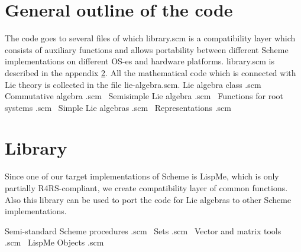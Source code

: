 \documentclass[a4paper,10pt]{article}%
\theoremstyle{definition} \newtheorem{Def}{Definition}
\begin{document}
            
\nwendcode{}\nwdocspar
\section{General outline of the code}
\label{sec:general-outline-code}

The code goes to several files of which {\Tt{}library.scm\nwendquote} is a compatibility layer which consists of auxiliary functions and allows portability between different Scheme implementations on different OS-es and hardware platforms. {\Tt{}library.scm\nwendquote} is described in the appendix \ref{sec:library}.
All the mathematical code which is connected with Lie theory is collected in the file {\Tt{}lie-algebra.scm\nwendquote}.
\nwenddocs{}\endmoddef\let\nwnotused=\nwoutput{}\nwstartdeflinemarkup\nwenddeflinemarkup
\LA{}Lie algebra class .scm~{\nwtagstyle{}}\RA{}
\LA{}Commutative algebra .scm~{\nwtagstyle{}}\RA{}
\LA{}Semisimple Lie algebra .scm~{\nwtagstyle{}}\RA{}
\LA{}Functions for root systems .scm~{\nwtagstyle{}}\RA{}
\LA{}Simple Lie algebras .scm~{\nwtagstyle{}}\RA{}
\LA{}Representations .scm~{\nwtagstyle{}}\RA{}
\nwnotused{lie-algebra.scm}\nwendcode{}\nwdocspar
\appendix

\section{Library}
\label{sec:library}
Since one of our target implementations of Scheme is LispMe, which is only partially R4RS-compliant, we create compatibility layer of common functions.
Also this library can be used to port the code for Lie algebras to other Scheme implementations.

\nwenddocs{}\endmoddef\let\nwnotused=\nwoutput{}\nwstartdeflinemarkup\nwenddeflinemarkup
\LA{}Semi-standard Scheme procedures .scm~{\nwtagstyle{}}\RA{}
\LA{}Sets .scm~{\nwtagstyle{}}\RA{}
\LA{}Vector and matrix tools .scm~{\nwtagstyle{}}\RA{}
\LA{}LispMe Objects .scm~{\nwtagstyle{}}\RA{}
\nwnotused{library.scm}\nwendcode{}\nwdocspar
\end{document}
